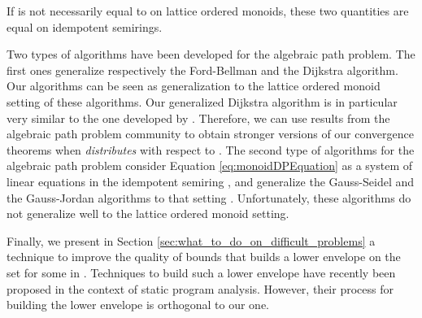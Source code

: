 \documentclass[11pt]{amsart}
\theoremstyle{plain}
\theoremstyle{remark}
\begin{document}
\noindent If  is not necessarily equal to  on lattice ordered monoids, these two quantities are equal on idempotent semirings.

Two types of algorithms have been developed for the algebraic path problem. The first ones generalize respectively the Ford-Bellman \citep{cousot1977abstract,cousot1979constructive} and the Dijkstra \citep{mohri2002semiring} algorithm. Our algorithms can be seen as generalization to the lattice ordered monoid setting of these algorithms. Our generalized Dijkstra algorithm is in particular very similar to the one developed by \citet{mohri2002semiring}. Therefore, we can use results from the algebraic path problem community to obtain stronger versions of our convergence theorems when  \emph{distributes} with respect to . The second type of algorithms for the algebraic path problem consider Equation \eqref{eq:monoidDPEquation} as a system of linear equations in the idempotent semiring , and generalize the Gauss-Seidel and the Gauss-Jordan algorithms to that setting \citep{gondran2008graphs,zimmermann1981linear}. Unfortunately, these algorithms do not generalize well to the lattice ordered monoid setting. 



Finally, we present in Section \ref{sec:what_to_do_on_difficult_problems} a technique to improve the quality of bounds that builds a lower envelope on the set  for some  in . Techniques to build such a lower envelope have recently been proposed \citep{amato2016efficiently,apinis2013combine} in the context of static program analysis. However, their process for building the lower envelope is orthogonal to our one.
\end{document}
